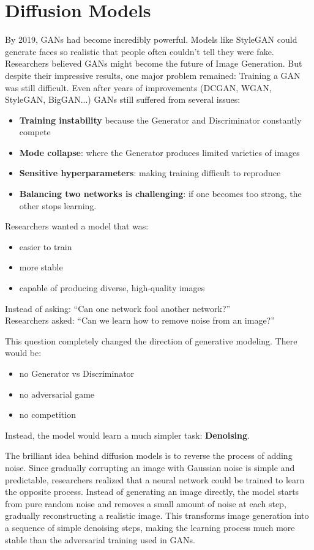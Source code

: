 \chapter{Diffusion Models}

By 2019, GANs had become incredibly powerful. Models like StyleGAN could generate faces so realistic that people often couldn't tell they were fake.
Researchers believed GANs might become the future of Image Generation. But despite their impressive results, one major problem remained: Training a GAN was still difficult.
Even after years of improvements (DCGAN, WGAN, StyleGAN, BigGAN...) GANs still suffered from several issues:
\begin{itemize}
    \item \textbf{Training instability} because the Generator and Discriminator constantly compete
    \item \textbf{Mode collapse}: where the Generator produces limited varieties of images
    \item \textbf{Sensitive hyperparameters}: making training difficult to reproduce
    \item \textbf{Balancing two networks is challenging}: if one becomes too strong, the other stops learning.
\end{itemize}

Researchers wanted a model that was:
\begin{itemize}
    \item easier to train
    \item more stable
    \item capable of producing diverse, high-quality images
\end{itemize}

Instead of asking: ``Can one network fool another network?'' \\
Researchers asked: ``Can we learn how to remove noise from an image?''

This question completely changed the direction of generative modeling. There would be:
\begin{itemize}
    \item no Generator vs Discriminator
    \item no adversarial game
    \item no competition
\end{itemize}
Instead, the model would learn a much simpler task: \textbf{Denoising}.

The brilliant idea behind diffusion models is to reverse the process of adding noise. Since gradually corrupting an image with Gaussian noise is simple and predictable, researchers realized that a neural network could be trained to learn the opposite process. Instead of generating an image directly, the model starts from pure random noise and removes a small amount of noise at each step, gradually reconstructing a realistic image. This transforms image generation into a sequence of simple denoising steps, making the learning process much more stable than the adversarial training used in GANs.

